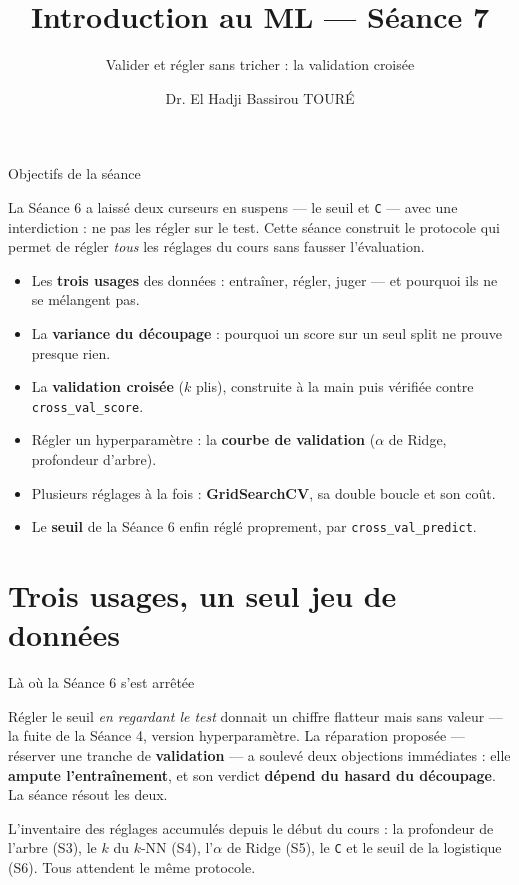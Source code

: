 \documentclass[aspectratio=169,11pt]{beamer}
\title{Introduction au ML — Séance 7}
\subtitle{Valider et régler sans tricher : la validation croisée}
\author{Dr. El Hadji Bassirou TOURÉ}
\institute{Département de Mathématiques et Informatique\\ Faculté des Sciences et Techniques\\ Université Cheikh Anta Diop de Dakar}
\date{}
\begin{document}
\begin{frame}\titlepage\end{frame}

\begin{frame}{Objectifs de la séance}
\begin{ucaddef}[Contenu]
{\small La Séance 6 a laissé deux curseurs en suspens — le seuil et \texttt{C} — avec une interdiction : ne pas les régler sur le test. Cette séance construit le protocole qui permet de régler \emph{tous} les réglages du cours sans fausser l'évaluation.}
\end{ucaddef}
\begin{itemize}\small
  \item Les \textbf{trois usages} des données : entraîner, régler, juger — et pourquoi ils ne se mélangent pas.
  \item La \textbf{variance du découpage} : pourquoi un score sur un seul split ne prouve presque rien.
  \item La \textbf{validation croisée} ($k$ plis), construite à la main puis vérifiée contre \texttt{cross\_val\_score}.
  \item Régler un hyperparamètre : la \textbf{courbe de validation} ($\alpha$ de Ridge, profondeur d'arbre).
  \item Plusieurs réglages à la fois : \textbf{GridSearchCV}, sa double boucle et son coût.
  \item Le \textbf{seuil} de la Séance 6 enfin réglé proprement, par \texttt{cross\_val\_predict}.
\end{itemize}
\end{frame}

\section{Trois usages, un seul jeu de données}

\begin{frame}{Là où la Séance 6 s'est arrêtée}
\begin{ucadfront}
{\small Régler le seuil \emph{en regardant le test} donnait un chiffre flatteur mais sans valeur — la fuite de la Séance 4, version hyperparamètre. La réparation proposée — réserver une tranche de \textbf{validation} — a soulevé deux objections immédiates : elle \textbf{ampute l'entraînement}, et son verdict \textbf{dépend du hasard du découpage}. La séance résout les deux.}
\end{ucadfront}
{\small L'inventaire des réglages accumulés depuis le début du cours : la profondeur de l'arbre (S3), le $k$ du $k$-NN (S4), l'$\alpha$ de Ridge (S5), le \texttt{C} et le seuil de la logistique (S6). Tous attendent le même protocole.}
\end{frame}
\end{document}
